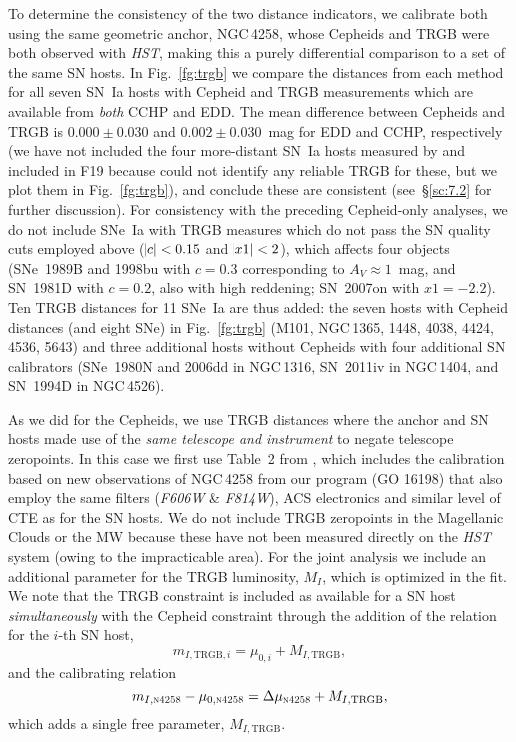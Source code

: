 \documentclass[12pt]{aastex631}
\newcommand{\bq}{\begin{equation}}
\newcommand{\eq}{\end{equation}}
\begin{document}
To determine the consistency of the two distance indicators, we calibrate both using the same geometric anchor, NGC$\,$4258, whose Cepheids and TRGB were both observed with {\it HST}, making this a purely differential comparison to a set of the same SN hosts.  In Fig.~\ref{fg:trgb} we compare the distances from each method for all seven SN~Ia hosts with Cepheid and TRGB measurements which are available from {\it both} CCHP and EDD.  The mean difference between Cepheids and TRGB is $0.000\pm0.030$ and $0.002\pm0.030$~mag for EDD and CCHP, respectively (we have not included the four more-distant SN~Ia hosts measured by \citet{Jang:2017} and included in F19 because \citealt{Anand:2021} could not identify any reliable TRGB for these, but we plot them in Fig.~\ref{fg:trgb}), and conclude these are consistent (see~\S\ref{sc:7.2} for further discussion).  For consistency with the preceding Cepheid-only analyses, we do not include SNe~Ia with TRGB measures which do not pass the SN quality cuts employed above ($\abs{c} < 0.15$ and $\abs{x1} < 2$), which affects four objects (SNe~1989B and 1998bu with $c=0.3$ corresponding to $A_V \approx 1$~mag, and SN~1981D with $c=0.2$, also with high reddening; SN~2007on with $x1 = -2.2$). Ten TRGB distances for 11 SNe~Ia are thus added: the seven hosts with Cepheid distances (and eight SNe) in Fig.~\ref{fg:trgb} (M101, NGC$\,$1365, 1448, 4038, 4424, 4536, 5643) and three additional hosts without Cepheids with four additional SN calibrators (SNe~1980N and 2006dd in NGC$\,$1316, SN~2011iv in NGC$\,$1404, and SN~1994D in NGC$\,$4526).  

As we did for the Cepheids, we use TRGB distances where the anchor and SN hosts made use of the {\it same telescope and instrument} to negate telescope zeropoints.  In this case we first use Table~2 from \citet{Anand:2021}, which includes the calibration based on new observations of NGC$\,$4258 from our program (GO 16198) that also employ the same filters ({\it F606W} \& {\it F814W}), ACS electronics and similar level of CTE as for the SN hosts. We do not include TRGB zeropoints in the Magellanic Clouds or the MW because these have not been measured directly on the {\it HST} system (owing to the impracticable area).
For the joint analysis we include an additional parameter for the TRGB luminosity, $M_I$, which is optimized in the fit.  We note that the TRGB constraint is included as available for a SN host {\it simultaneously} with the Cepheid constraint through the addition of the relation for the $i$-th SN host,
\bq m_{I,\textrm{TRGB},i}=\mu_{0,i}+M_{I,\textrm{TRGB}} , \eq
and the calibrating relation
\bq m_{I,\textsc{n4258}}-\mu_{0,\textsc{n4258}}=\Delta \mu_{\textsc{n4258}}+M_{I,\textrm{TRGB}} , \eq
which adds a single free parameter, $M_{I,\textrm{TRGB}}$.
\end{document}
